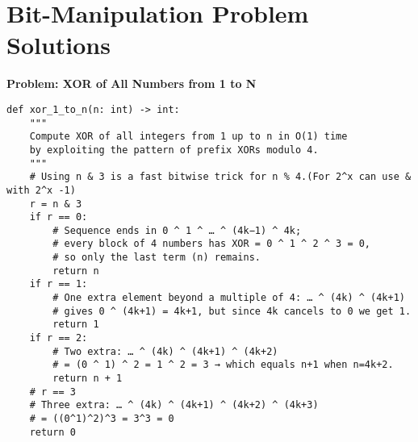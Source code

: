 % 
% 
\section*{Bit-Manipulation Problem Solutions}

    \noindent\textbf{Problem: XOR of All Numbers from 1 to N}
    \begin{verbatim}
def xor_1_to_n(n: int) -> int:
    """
    Compute XOR of all integers from 1 up to n in O(1) time
    by exploiting the pattern of prefix XORs modulo 4.
    """
    # Using n & 3 is a fast bitwise trick for n % 4.(For 2^x can use & with 2^x -1)
    r = n & 3
    if r == 0:
        # Sequence ends in 0 ^ 1 ^ … ^ (4k−1) ^ 4k;
        # every block of 4 numbers has XOR = 0 ^ 1 ^ 2 ^ 3 = 0,
        # so only the last term (n) remains.
        return n
    if r == 1:
        # One extra element beyond a multiple of 4: … ^ (4k) ^ (4k+1)
        # gives 0 ^ (4k+1) = 4k+1, but since 4k cancels to 0 we get 1.
        return 1
    if r == 2:
        # Two extra: … ^ (4k) ^ (4k+1) ^ (4k+2)
        # = (0 ^ 1) ^ 2 = 1 ^ 2 = 3 → which equals n+1 when n=4k+2.
        return n + 1
    # r == 3
    # Three extra: … ^ (4k) ^ (4k+1) ^ (4k+2) ^ (4k+3)
    # = ((0^1)^2)^3 = 3^3 = 0
    return 0

    \end{verbatim}

